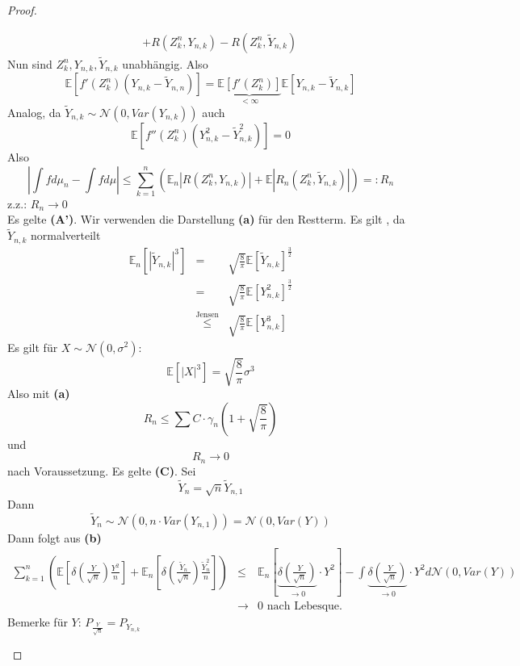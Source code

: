\documentclass[10pt,a4paper]{report}
\numberwithin{equation}{section}
\numberwithin{figure}{section}
\theoremstyle{plain}
\theoremstyle{definition}
\theoremstyle{remark}
\theoremstyle{plain}
\newcommand{\1}{ \mathbb{1} } %
\begin{document}
\begin{proof}
\begin{description}
\begin{eqnarray*}
 &  & +R\left(Z_{k}^{n},Y_{n,k}\right)-R\left(Z_{k}^{n},\tilde{Y}_{n,k}\right)
\end{eqnarray*}
Nun sind $Z_{k}^{n},Y_{n,k},\tilde{Y}_{n,k}$ unabhängig. Also 
\[
\mathbb{E}\left[f'\left(Z_{k}^{n}\right)\left(Y_{n,k}-\tilde{Y}_{n,n}\right)\right]=\underset{<\infty}{\underbrace{\mathbb{E}\left[f'\left(Z_{k}^{n}\right)\right]}}\mathbb{E}\left[Y_{n,k}-\tilde{Y}_{n,k}\right]
\]
Analog, da $\tilde{Y}_{n,k}\sim\mathcal{N}\left(0,Var\left(Y_{n,k}\right)\right)$
auch 
\[
\mathbb{E}\left[f''\left(Z_{k}^{n}\right)\left(Y_{n,k}^{2}-\tilde{Y}_{n,k}^{2}\right)\right]=0
\]
Also 
\[
\left|\int fd\mu_{n}-\int fd\mu\right|\leq\sum_{k=1}^{n}\left(\mathbb{E}_{n}\left|R\left(Z_{k}^{n},Y_{n,k}\right)\right|+\mathbb{E}\left|R_{n}\left(Z_{k}^{n},\tilde{Y}_{n,k}\right)\right|\right)=:R_{n}
\]
z.z.: $R_{n}\to0$\\
Es gelte \textbf{(A')}. Wir verwenden die Darstellung \textbf{(a)}
für den Restterm. Es gilt , da $\tilde{Y}_{n,k}$ normalverteilt 
\begin{eqnarray*}
\mathbb{E}_{n}\left[\left|\tilde{Y}_{n,k}\right|^{3}\right] & = & \sqrt{\frac{8}{\pi}}\mathbb{E}\left[\tilde{Y}_{n,k}\right]^{\frac{3}{2}}\\
 & = & \sqrt{\frac{8}{\pi}}\mathbb{E}\left[Y_{n,k}^{2}\right]^{\frac{3}{2}}\\
 & \overset{\mbox{Jensen}}{\leq} & \sqrt{\frac{8}{\pi}}\mathbb{E}\left[Y_{n,k}^{3}\right]
\end{eqnarray*}
Es gilt für $X\sim\mathcal{N}\left(0,\sigma^{2}\right)$:
\[
\mathbb{E}\left[\left|X\right|^{3}\right]=\sqrt{\frac{8}{\pi}}\sigma^{3}
\]
Also mit \textbf{(a)} 
\[
R_{n}\leq\sum C\cdot\gamma_{n}\left(1+\sqrt{\frac{8}{\pi}}\right)
\]
und 
\[
R_{n}\to0
\]
nach Voraussetzung. Es gelte \textbf{(C)}. Sei 
\[
\tilde{Y}_{n}=\sqrt{n}\tilde{Y}_{n,1}
\]
Dann 
\[
\tilde{Y}_{n}\sim\mathcal{N}\left(0,n\cdot Var\left(Y_{n,1}\right)\right)=\mathcal{N}\left(0,Var\left(Y\right)\right)
\]
 Dann folgt aus \textbf{(b)} 
\begin{eqnarray*}
\sum_{k=1}^{n}\left(\mathbb{E}\left[\delta\left(\frac{Y}{\sqrt{n}}\right)\frac{Y^{2}}{n}\right]+\mathbb{E}_{n}\left[\delta\left(\frac{\tilde{Y}_{n}}{\sqrt{n}}\right)\frac{\tilde{Y}_{n}^{2}}{n}\right]\right) & \leq & \mathbb{E}_{n}\left[\underset{\to0}{\underbrace{\delta\left(\frac{Y}{\sqrt{n}}\right)}}\cdot Y^{2}\right]-\int\underset{\to0}{\underbrace{\delta\left(\frac{Y}{\sqrt{n}}\right)}}\cdot Y^{2}d\mathcal{N}\left(0,Var\left(Y\right)\right)\\
 & \to & 0\mbox{ nach Lebesque.}
\end{eqnarray*}
Bemerke für $Y$: $P_{\frac{Y}{\sqrt{n}}}=P_{Y_{n,k}}$
\end{description}
\end{proof}
\end{document}
